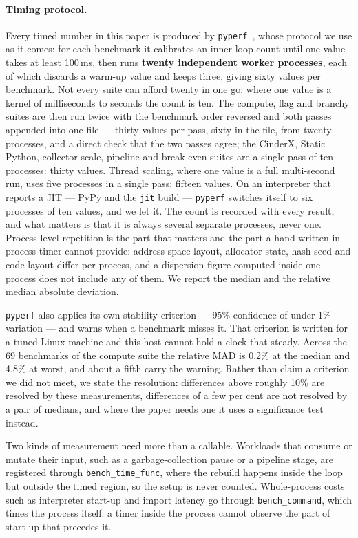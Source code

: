 \documentclass[10pt,a4paper]{article}
\newcommand{\meas}[2]{#2}
\newcommand{\code}[1]{\texttt{\small #1}}
\begin{document}
\paragraph{Timing protocol.}
Every timed number in this paper is produced by \code{pyperf}~\cite{pyperf}, whose protocol we
use as it comes: for each
benchmark it calibrates an inner loop count until one value takes at least 100\,ms, then runs
\textbf{twenty independent worker processes}, each of which discards a warm-up value and keeps
three, giving sixty values per benchmark. Not every suite can afford twenty in one go: where one
value is a kernel of milliseconds to seconds the count is ten. The compute, flag and branchy
suites are then run twice with the benchmark order reversed and both passes appended into one
file --- thirty values per pass, sixty in the file, from twenty processes, and a direct check
that the two passes agree; the CinderX, Static Python, collector-scale, pipeline and
break-even suites are a single pass of ten processes: thirty values.
Thread scaling, where one value is a full multi-second run, uses five processes in a single
pass: fifteen values. On an interpreter that reports a JIT --- PyPy and the \code{jit} build ---
\code{pyperf} switches itself to six processes of ten values, and we let it. The count is
recorded with every result, and what matters is that it is always several separate processes,
never one. Process-level
repetition is the part that matters and the part a hand-written in-process timer cannot
provide: address-space layout, allocator state, hash seed and code layout differ per process,
and a dispersion figure computed inside one process does not include any of them. We report
the median and the relative median absolute deviation.

\code{pyperf} also applies its own stability criterion --- 95\% confidence of under 1\%
variation --- and warns when a benchmark misses it. That criterion is written for a tuned Linux
machine and this host cannot hold a clock that steady.
Across the 69 benchmarks of the compute suite the relative MAD is \meas{madagg:b1_compute:median}{0.2}\% at the median and \meas{mad:b1_compute-pypy311:call_overhead/cython}{4.8}\%
at worst, and about a fifth carry the warning. Rather than claim a criterion we did not meet, we
state the resolution: differences above roughly 10\% are resolved by these measurements,
differences of a few per cent are not resolved by a pair of medians, and where the paper needs
one it uses a significance test instead.

Two kinds of measurement need more than a callable. Workloads that consume or mutate their
input, such as a garbage-collection pause or a pipeline stage, are registered through
\code{bench\_time\_func}, where the rebuild happens inside the loop but outside the timed
region, so the setup is never counted. Whole-process costs such as interpreter start-up and
import latency go through \code{bench\_command}, which times the process itself: a timer
inside the process cannot observe the part of start-up that precedes it.
\end{document}
